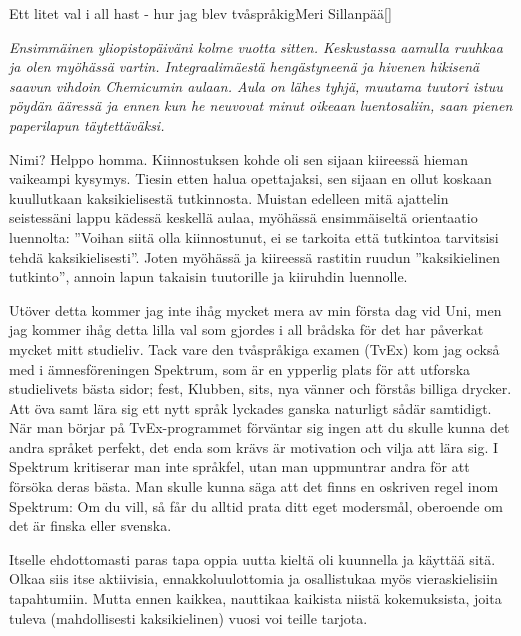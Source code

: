 \documentclass{spektraklet}
\begin{document}
\begin{artikel}{Ett litet val i all hast - hur jag blev tvåspråkig}{Meri Sillanpää}[]
\begin{twocolumns}

\textit{Ensimmäinen yliopistopäiväni kolme vuotta sitten. Keskustassa aamulla ruuhkaa ja olen myöhässä vartin. Integraalimäestä hengästyneenä ja hivenen hikisenä saavun vihdoin Chemicumin aulaan. Aula on lähes tyhjä, muutama tuutori istuu pöydän ääressä ja ennen kun he neuvovat minut oikeaan luentosaliin, saan pienen paperilapun täytettäväksi.}
 
\vspace{0.2cm}
\noindent{}
\vspace{0.2cm}

Nimi? Helppo homma. Kiinnostuksen kohde oli sen sijaan kiireessä hieman vaikeampi kysymys. Tiesin etten halua opettajaksi, sen sijaan en ollut koskaan kuullutkaan kaksikielisestä tutkinnosta. Muistan edelleen mitä ajattelin seistessäni lappu kädessä keskellä aulaa, myöhässä ensimmäiseltä orientaatio luennolta: ”Voihan siitä olla kiinnostunut, ei se tarkoita että tutkintoa tarvitsisi tehdä kaksikielisesti”. Joten myöhässä ja kiireessä rastitin ruudun ”kaksikielinen tutkinto”, annoin lapun takaisin tuutorille ja kiiruhdin luennolle.

\columnbreak
Utöver detta kommer jag inte ihåg mycket mera av min första dag vid Uni, men jag kommer ihåg detta lilla val som gjordes i all brådska för det har påverkat mycket mitt studieliv. Tack vare den tvåspråkiga examen (TvEx) kom jag också med i ämnesföreningen Spektrum, som är en ypperlig plats för att utforska studielivets bästa sidor; fest, Klubben, sits, nya vänner och förstås billiga drycker. Att öva samt lära sig ett nytt språk lyckades ganska naturligt sådär samtidigt. När man börjar på TvEx-programmet förväntar sig ingen att du skulle kunna det andra språket perfekt, det enda som krävs är motivation och vilja att lära sig. I Spektrum kritiserar man inte språkfel, utan man uppmuntrar andra för att försöka deras bästa. Man skulle kunna säga att det finns en oskriven regel inom Spektrum: Om du vill, så får du alltid prata ditt eget modersmål, oberoende om det är finska eller svenska.

Itselle ehdottomasti paras tapa oppia uutta kieltä oli kuunnella ja käyttää sitä. Olkaa siis itse aktiivisia, ennakkoluulottomia ja osallistukaa myös vieraskielisiin tapahtumiin. Mutta ennen kaikkea, nauttikaa kaikista niistä kokemuksista, joita tuleva (mahdollisesti kaksikielinen) vuosi voi teille tarjota.

\end{twocolumns}
\end{artikel}
\end{document}
